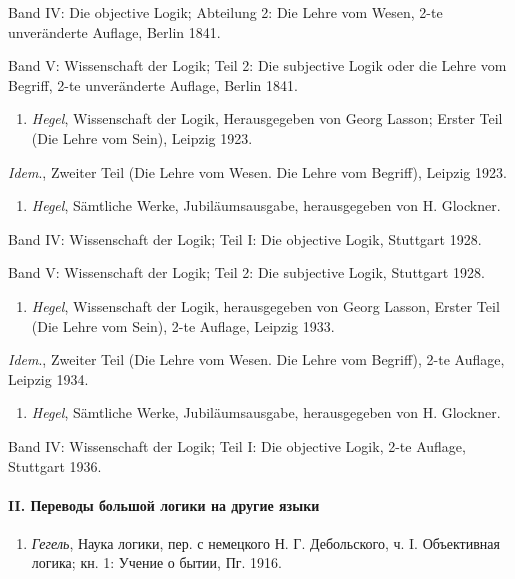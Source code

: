 {{Band IV: Die objective Logik; Abteilung 2: Die Lehre vom Wesen, 2-te
unveränderte Auflage, Berlin 1841.

Band V: Wissenschaft der Logik; Teil 2: Die subjective Logik oder die Lehre
vom Begriff, 2-te unveränderte Auflage, Berlin 1841.


\begin{enumerate}
\item
{\em Hegel}, Wissenschaft der Logik, Herausgegeben von Georg Lasson;
Erster Teil (Die Lehre vom Sein), Leipzig 1923.
\end{enumerate}

{\em Idem}., Zweiter Teil (Die Lehre vom Wesen. Die Lehre vom Begriff),
Leipzig 1923.

\begin{enumerate}
\item
{\em Hegel}, Sämtliche Werke, Jubiläumsausgabe, herausgegeben von
H. Glockner.
\end{enumerate}

Band IV: Wissenschaft der Logik; Teil I: Die objective Logik,
Stuttgart 1928.

Band V: Wissenschaft der Logik; Teil 2: Die subjective Logik,
Stuttgart 1928.

\begin{enumerate}
\item
{\em Hegel}, Wissenschaft der Logik, herausgegeben von Georg Lasson,
Erster Teil (Die Lehre vom Sein), 2-te Auflage, Leipzig 1933.
\end{enumerate}

{\em Idem}., Zweiter Teil (Die Lehre vom Wesen. Die Lehre vom Begriff),
2-te Auflage, Leipzig 1934.

\begin{enumerate}
\item
{\em Hegel}, Sämtliche Werke, Jubiläumsausgabe, herausgegeben von
H. Glockner.
\end{enumerate}

Band IV: Wissenschaft der Logik; Teil I: Die objective Logik, 2-te Auflage,
Stuttgart 1936.

\paragraph[II. Переводы большой логики на другие языки]
{II. Переводы большой логики на другие языки }

\begin{enumerate}
\item
{\em Гегель}, Наука логики, пер. с немецкого Н. Г. Дебольского, ч. I.
Объективная логика; кн. 1: Учение о бытии, Пг. 1916.
\end{enumerate}

}}
